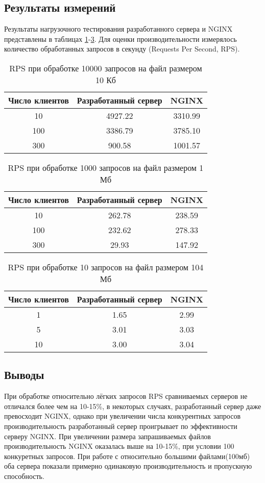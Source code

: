 \subsection{Результаты измерений}
Результаты нагрузочного тестирования разработанного сервера и NGINX представлены в таблицах \ref{tab:1}-\ref{tab:3}. Для оценки производительности измерялось количество обработанных запросов в секунду (Requests Per Second, RPS).

\begin{table}[h]
	\centering
	\caption{RPS при обработке 10000 запросов на файл размером 10 Кб}
	\label{tab:1}
	\begin{tabular}{|c|c|c|}
		\hline
		Число клиентов & Разработанный сервер & NGINX \\ \hline
		10 & 4927.22 & 3310.99 \\ \hline
		100 & 3386.79 & 3785.10 \\ \hline
		300 & 900.58 & 1001.57 \\ \hline
	\end{tabular}
\end{table}

\begin{table}[h]
	\centering
	\caption{RPS при обработке 1000 запросов на файл размером 1 Мб}
	\label{tab:2}
	\begin{tabular}{|c|c|c|}
		\hline
		Число клиентов & Разработанный сервер & NGINX \\ \hline
		10& 262.78 & 238.59 \\ \hline
		100 & 232.62 & 278.33 \\ \hline
		300 & 29.93 & 147.92 \\ \hline
	\end{tabular}
\end{table}

\begin{table}[h]
	\centering
	\caption{RPS при обработке 10 запросов на файл размером 104 Мб}
	\label{tab:3}
	\begin{tabular}{|c|c|c|}
		\hline
		Число клиентов & Разработанный сервер & NGINX \\ \hline
		1 & 1.65 & 2.99 \\ \hline
		5 & 3.01 & 3.03 \\ \hline
		10 & 3.00 & 3.04 \\ \hline
	\end{tabular}
\end{table}

\subsection{Выводы}
При обработке относительно лёгких запросов RPS сравниваемых серверов не отличался более чем на 10-15\%, в некоторых случаях, разработанный сервер даже превосходит NGINX, однако при увеличении числа конкурентных запросов производительность разработанный сервер проигрывает по эффективности серверу NGINX. При увеличении размера запрашиваемых файлов
производительность NGINX оказалась выше на 10-15\%, при условии 100 конкуретных запросов. При работе с относительно большими файлами(100мб) оба сервера показали примерно одинаковую производительность и пропускную способность.

\pagebreak